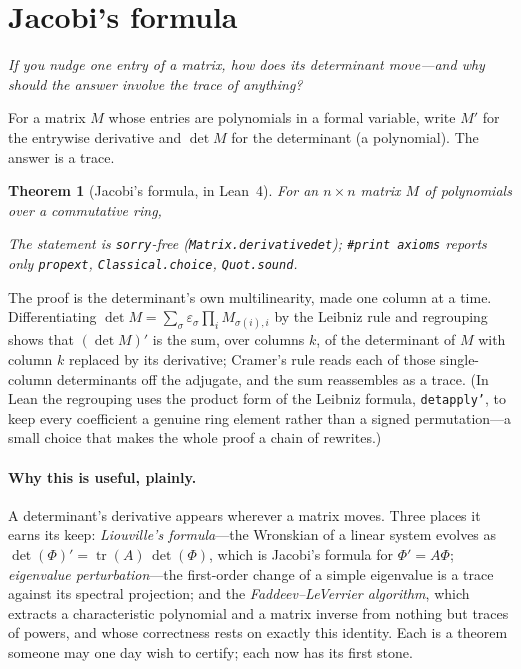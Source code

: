 \documentclass[11pt]{article}
\newtheorem{theorem}{Theorem}
\newcommand{\lean}[1]{{\def\_{\textunderscore\allowbreak}\texttt{#1}}}
\newcommand{\tr}{\operatorname{tr}}
\newcommand{\adj}{\operatorname{adj}}
\newcommand{\keyeq}[1]{\begin{center}\keybox{$\displaystyle #1$}\end{center}}
\begin{document}
\section{Jacobi's formula}
\label{sec:jacobi}

\emph{If you nudge one entry of a matrix, how does its determinant move---and why should the answer
involve the trace of anything?}

For a matrix $M$ whose entries are polynomials in a formal variable, write $M'$ for the entrywise
derivative and $\det M$ for the determinant (a polynomial). The answer is a trace.

\begin{theorem}[Jacobi's formula, in Lean~4]
\label{thm:jacobi}
For an $n\times n$ matrix $M$ of polynomials over a commutative ring,
\keyeq{(\det M)'\;=\;\tr\!\bigl(\adj M\cdot M'\bigr).}
The statement is \lean{sorry}-free (\lean{Matrix.derivative\_det});
\lean{\#print axioms} reports only \lean{propext}, \lean{Classical.choice}, \lean{Quot.sound}.
\end{theorem}

The proof is the determinant's own multilinearity, made one column at a time. Differentiating
$\det M=\sum_\sigma\varepsilon_\sigma\prod_i M_{\sigma(i),i}$ by the Leibniz rule and regrouping shows
that $(\det M)'$ is the sum, over columns $k$, of the determinant of $M$ with column $k$ replaced by
its derivative; Cramer's rule reads each of those single-column determinants off the adjugate, and
the sum reassembles as a trace. (In Lean the regrouping uses the product form of the Leibniz
formula, \lean{det\_apply'}, to keep every coefficient a genuine ring element rather than a signed
permutation---a small choice that makes the whole proof a chain of rewrites.)

\paragraph{Why this is useful, plainly.}
A determinant's derivative appears wherever a matrix moves. Three places it earns its keep:
\emph{Liouville's formula}---the Wronskian of a linear system evolves as
$\det(\Phi)'=\tr(A)\,\det(\Phi)$, which is Jacobi's formula for $\Phi'=A\Phi$; \emph{eigenvalue
perturbation}---the first-order change of a simple eigenvalue is a trace against its spectral
projection; and the \emph{Faddeev--LeVerrier algorithm}, which extracts a characteristic polynomial
and a matrix inverse from nothing but traces of powers, and whose correctness rests on exactly this
identity. Each is a theorem someone may one day wish to certify; each now has its first stone.
\end{document}
